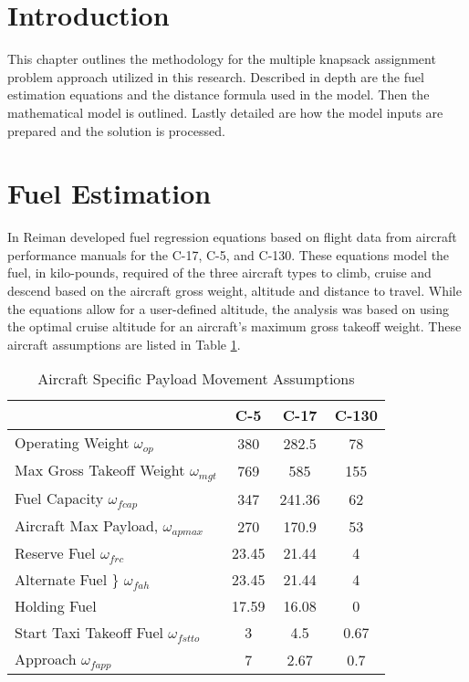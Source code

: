 \section{Introduction}
This chapter outlines the methodology for the multiple knapsack assignment problem approach utilized in this research. Described in depth are the fuel estimation equations and the distance formula used in the model. Then the mathematical model is outlined. Lastly detailed are how the model inputs are prepared and the solution is processed.

\section{Fuel Estimation} \label{sec_fuelEquations}
In \cite{Reiman2014} Reiman developed fuel regression equations based on flight data from aircraft performance manuals for the C-17, C-5, and C-130.  These equations model the fuel, in kilo-pounds, required of the three aircraft types to climb, cruise and descend based on the aircraft gross weight, altitude and distance to travel.  While the equations allow for a user-defined altitude, the analysis was based on using the optimal cruise altitude for an aircraft's maximum gross takeoff weight. These aircraft assumptions are listed in Table \ref{tableAssume}.  
\begin{table}[h!]
\centering
\caption{Aircraft Specific Payload Movement Assumptions \cite{Reiman2014}}
\label{tableAssume}
\begin{tabular}{@{}lccc@{}}
\toprule
 & C-5 & C-17 & C-130 \\ \midrule
Operating Weight $\omega_{op}$ & 380 & 282.5 & 78 \\
Max Gross Takeoff Weight $\omega_{mgt}$ & 769 & 585 & 155 \\
Fuel Capacity $\omega_{fcap}$ & 347 & 241.36 & 62 \\
Aircraft Max Payload, $\omega_{apmax}$ & 270 & 170.9 & 53 \\
Reserve Fuel $\omega_{frc}$& 23.45 & 21.44 & 4 \\
Alternate Fuel \} $\omega_{fah}$ & 23.45 & 21.44 & 4 \\
Holding Fuel  & 17.59 & 16.08 & 0 \\
Start Taxi Takeoff Fuel $\omega_{fstto}$ & 3 & 4.5 & 0.67 \\
Approach $\omega_{fapp}$ & 7 & 2.67 & 0.7 \\ \bottomrule
\end{tabular}
\end{table}


